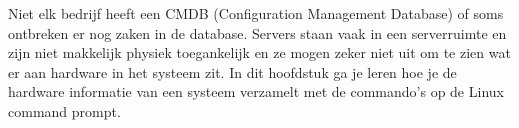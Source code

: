 Niet elk bedrijf heeft een CMDB (Configuration Management Database) of soms ontbreken er nog zaken in de database. Servers staan vaak in een serverruimte en zijn niet makkelijk physiek toegankelijk en ze mogen zeker niet uit om te zien wat er aan hardware in het systeem zit. In dit hoofdstuk ga je leren hoe je de hardware informatie van een systeem verzamelt met de commando's op de Linux command prompt.

